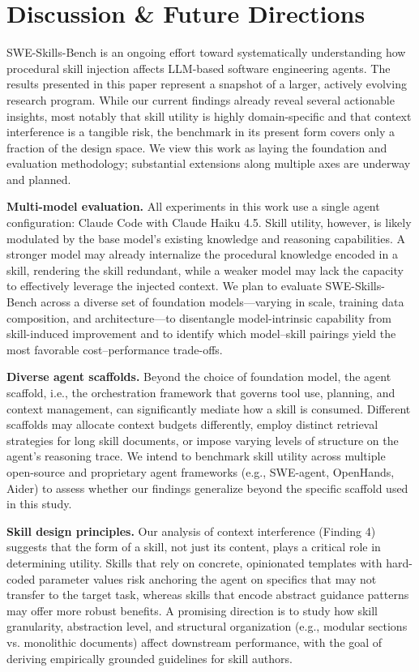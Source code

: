 \documentclass{article}
\newcommand{\ours}{SWE-Skills-Bench}
\begin{document}
\section{Discussion \& Future Directions}
\label{sec:discussion}

\ours{} is an ongoing effort toward systematically understanding how procedural skill injection affects LLM-based software engineering agents. The results presented in this paper represent a snapshot of a larger, actively evolving research program. While our current findings already reveal several actionable insights, most notably that skill utility is highly domain-specific and that context interference is a tangible risk, the benchmark in its present form covers only a fraction of the design space. We view this work as laying the foundation and evaluation methodology; substantial extensions along multiple axes are underway and planned.

\textbf{Multi-model evaluation.} 
All experiments in this work use a single agent configuration: Claude Code with Claude Haiku 4.5. Skill utility, however, is likely modulated by the base model's existing knowledge and reasoning capabilities. A stronger model may already internalize the procedural knowledge encoded in a skill, rendering the skill redundant, while a weaker model may lack the capacity to effectively leverage the injected context. We plan to evaluate SWE-Skills-Bench across a diverse set of foundation models—varying in scale, training data composition, and architecture—to disentangle model-intrinsic capability from skill-induced improvement and to identify which model–skill pairings yield the most favorable cost–performance trade-offs.

\textbf{Diverse agent scaffolds.}
Beyond the choice of foundation model, the agent scaffold, i.e., the orchestration framework that governs tool use, planning, and context management, can significantly mediate how a skill is consumed. Different scaffolds may allocate context budgets differently, employ distinct retrieval strategies for long skill documents, or impose varying levels of structure on the agent's reasoning trace. We intend to benchmark skill utility across multiple open-source and proprietary agent frameworks (e.g., SWE-agent, OpenHands, Aider) to assess whether our findings generalize beyond the specific scaffold used in this study.

\textbf{Skill design principles.}
Our analysis of context interference (Finding 4) suggests that the form of a skill, not just its content, plays a critical role in determining utility. Skills that rely on concrete, opinionated templates with hard-coded parameter values risk anchoring the agent on specifics that may not transfer to the target task, whereas skills that encode abstract guidance patterns may offer more robust benefits. A promising direction is to study how skill granularity, abstraction level, and structural organization (e.g., modular sections vs. monolithic documents) affect downstream performance, with the goal of deriving empirically grounded guidelines for skill authors.
\end{document}

